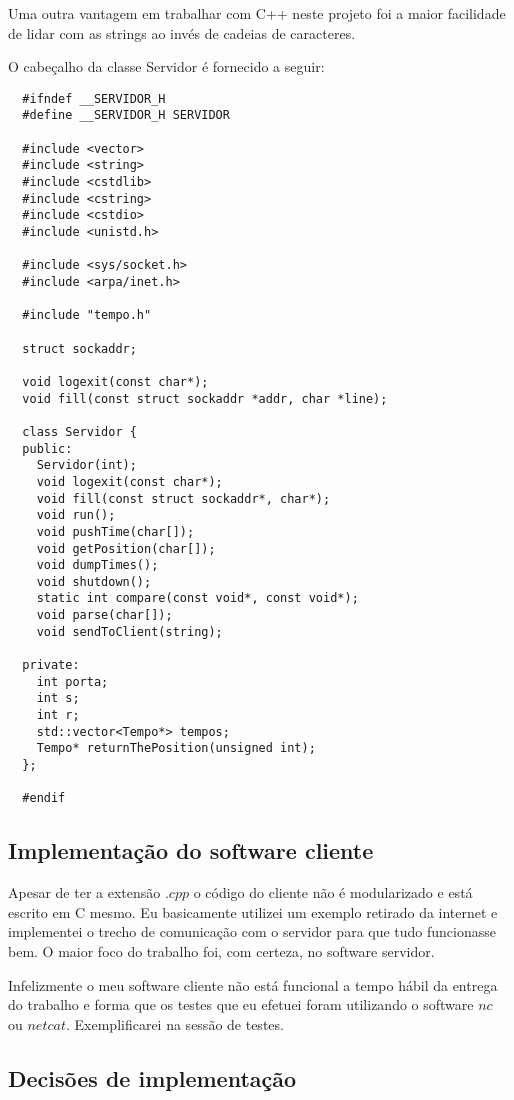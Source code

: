\documentclass[12pt]{article}
\begin{document}
Uma outra vantagem em trabalhar com C++ neste projeto foi a maior facilidade de
lidar com as strings ao invés de cadeias de caracteres.

O cabeçalho da classe Servidor é fornecido a seguir:

\begin{verbatim}
  #ifndef __SERVIDOR_H
  #define __SERVIDOR_H SERVIDOR

  #include <vector>
  #include <string>
  #include <cstdlib>
  #include <cstring>
  #include <cstdio>
  #include <unistd.h>

  #include <sys/socket.h>
  #include <arpa/inet.h>

  #include "tempo.h"

  struct sockaddr;

  void logexit(const char*);
  void fill(const struct sockaddr *addr, char *line);

  class Servidor {
  public:
    Servidor(int);
    void logexit(const char*);
    void fill(const struct sockaddr*, char*);
    void run();
    void pushTime(char[]);
    void getPosition(char[]);
    void dumpTimes();
    void shutdown();
    static int compare(const void*, const void*);
    void parse(char[]);
    void sendToClient(string);

  private:
    int porta;
    int s;
    int r;
    std::vector<Tempo*> tempos;
    Tempo* returnThePosition(unsigned int);
  };

  #endif
\end{verbatim}

\subsection{Implementação do software cliente}

Apesar de ter a extensão $.cpp$ o código do cliente não é modularizado e está
escrito em C mesmo. Eu basicamente utilizei um exemplo retirado da internet
e implementei o trecho de comunicação com o servidor para que tudo funcionasse
bem. O maior foco do trabalho foi, com certeza, no software servidor.

Infelizmente o meu software cliente não está funcional a tempo hábil da entrega
do trabalho e forma que os testes que eu efetuei foram utilizando o software
$nc$ ou $netcat$. Exemplificarei na sessão de testes.

\subsection{Decisões de implementação}
\end{document}
